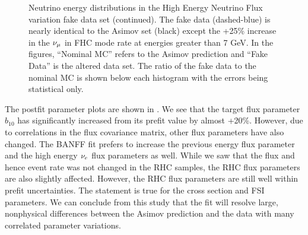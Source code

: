 \begin{figure}
\begin{centering}
{\begin{centering}
\par\end{centering}
}
\par\end{centering}
\caption[Neutrino Energy Distributions in the High Energy Neutrino Flux Variation
Fake Data Set (Continued)]{Neutrino energy distributions in the High Energy Neutrino Flux variation
fake data set (continued). The fake data (dashed-blue) is nearly identical
to the Asimov set (black) except the +25\% increase in the $\protect\nu_{\mu}$
in FHC mode rate at energies greater than 7 GeV. In the figures, ``Nominal
MC'' refers to the Asimov prediction and ``Fake Data'' is the altered
data set. The ratio of the fake data to the nominal MC is shown below
each histogram with the errors being statistical only.\label{fig:Neutrino-flux-fake-data-set-1}}
\end{figure}

The postfit parameter plots are shown in .
We see that the target flux parameter $b_{10}$ has significantly
increased from its prefit value by almost +20\%. However, due to correlations
in the flux covariance matrix, other flux parameters have also changed.
The BANFF fit prefers to increase the previous energy flux parameter
and the high energy $\nu_{e}$ flux parameters as well. While we saw
that the flux and hence event rate was not changed in the RHC samples,
the RHC flux parameters are also slightly affected. However, the RHC
flux parameters are still well within prefit uncertainties. The statement
is true for the cross section and FSI parameters. We can conclude
from this study that the fit will resolve large, nonphysical differences
between the Asimov prediction and the data with many correlated parameter
variations.

